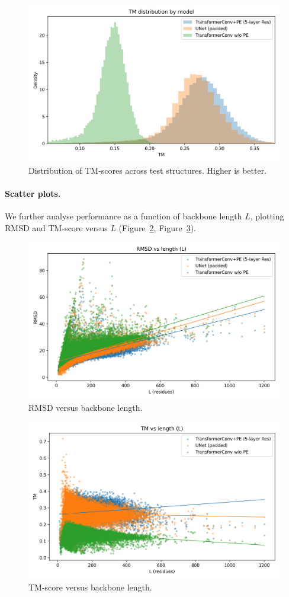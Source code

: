 \documentclass[a4paper,12pt]{article}
\begin{document}
\begin{figure}[htbp]
\centering
\includegraphics[width=0.7\linewidth]{tm_dist.png}
\caption{Distribution of TM-scores across test structures. Higher is better.}
\label{fig:tm-hist}
\end{figure}

\paragraph{Scatter plots.}
We further analyse performance as a function of backbone length \(L\), plotting RMSD and TM-score versus \(L\) (Figure~\ref{fig:rmsd-vs-l}, Figure~\ref{fig:tm-vs-l}).

\begin{figure}[htbp]
\centering
\includegraphics[width=0.7\linewidth]{rmsd_vs_L.png}
\caption{RMSD versus backbone length.}
\label{fig:rmsd-vs-l}
\end{figure}

\begin{figure}[htbp]
\centering
\includegraphics[width=0.7\linewidth]{tm_vs_L.png}
\caption{TM-score versus backbone length.}
\label{fig:tm-vs-l}
\end{figure}
\end{document}
